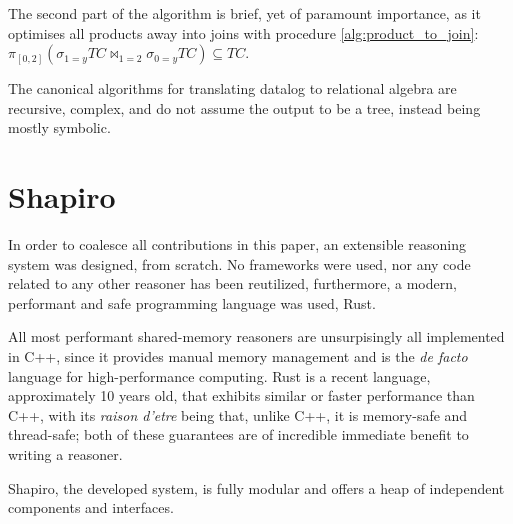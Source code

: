 \documentclass[manuscript,screen,review]{acmart}
\theoremstyle{definition}
\begin{document}
The second part of the algorithm is brief, yet of paramount importance, as it optimises all products away into joins with procedure \ref{alg:product_to_join}: $\pi_{[0, 2]}(\sigma_{1=y}TC \Join_{1=2} \sigma_{0=y}TC) \subseteq TC$.

The canonical algorithms for translating datalog to relational algebra\cite{opt_sys_alg_ev_dat, log_dab} are recursive, complex,
and do not assume the output to be a tree, instead being mostly symbolic.

\section{Shapiro}
In order to coalesce all contributions in this paper, an extensible reasoning system was designed, from scratch. No frameworks
were used, nor any code related to any other reasoner has been reutilized, furthermore, a modern, performant and safe programming
language was used, Rust\cite{rust_lang}.

All most performant shared-memory reasoners are unsurpisingly all implemented in C++\cite{rdfox, vadalog, souffle}, since
it provides manual memory management and is the \textit{de facto} language for high-performance computing. Rust is a
recent language, approximately 10 years old, that exhibits similar or faster performance than C++, with its \textit{raison d'etre}
being that, unlike C++, it is memory-safe and thread-safe\cite{rust2014,rustbelt,rustsafety}; both of these guarantees are
of incredible immediate benefit to writing a reasoner.

Shapiro, the developed system, is fully modular and offers a heap of independent components and interfaces.
\end{document}

